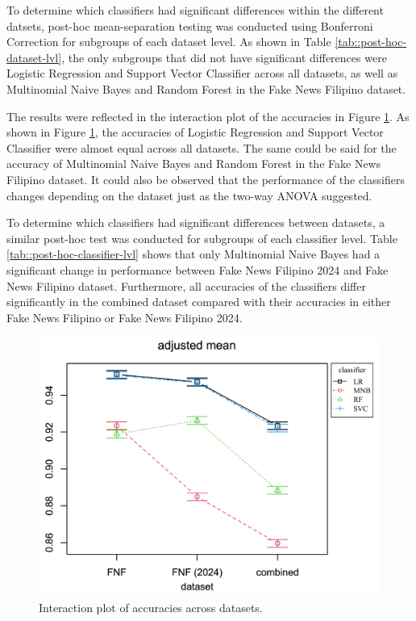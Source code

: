 To determine which classifiers had significant differences within the different datsets, post-hoc mean-separation testing was conducted using Bonferroni Correction for subgroups of each dataset level. As shown in Table \ref{tab::post-hoc-dataset-lvl}, the only subgroups that did not have significant differences were Logistic Regression and Support Vector Classifier across all datasets, as well as Multinomial Naive Bayes and Random Forest in the Fake News Filipino dataset.

The results were reflected in the interaction plot of the accuracies in Figure \ref{fig:interaction_plot}. As shown in Figure \ref{fig:interaction_plot}, the accuracies of Logistic Regression and Support Vector Classifier were almost equal across all datasets. The same could be said for the accuracy of Multinomial Naive Bayes and Random Forest in the Fake News Filipino dataset. It could also be observed that the performance of the classifiers changes depending on the dataset just as the two-way ANOVA suggested.

To determine which classifiers had significant differences between datasets, a similar post-hoc test was conducted for subgroups of each classifier level. Table \ref{tab::post-hoc-classifier-lvl} shows that only Multinomial Naive Bayes had a significant change in performance between Fake News Filipino 2024 and Fake News Filipino dataset. Furthermore, all accuracies of the classifiers differ significantly in the combined dataset compared with their accuracies in either Fake News Filipino or Fake News Filipino 2024.

\begin{figure}[h!]
    \centering
    \includegraphics[width=\textwidth,height=\textheight, keepaspectratio]{figures/stats/im.png}
        \caption{Interaction plot of accuracies across datasets.}
        \label{fig:interaction_plot}
\end{figure}

